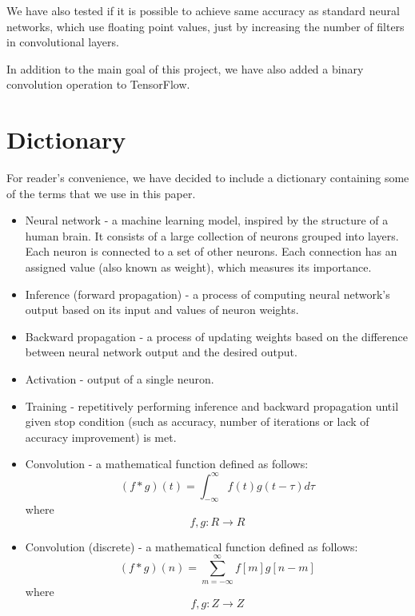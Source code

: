 \documentclass[licencjacka]{pracamgr}
\begin{document}
	We have also tested if it is possible to achieve same accuracy as standard neural networks, which use floating point values, just by increasing the number of filters in convolutional layers.
	
	In addition to the main goal of this project, we have also added a binary convolution operation to TensorFlow.

\chapter{Dictionary}
    For reader's convenience, we have decided to include a dictionary containing some of the terms that we use in this paper. 
    
    \begin{itemize}
        \item Neural network - a machine learning model, inspired by the structure of a human brain. It consists of a large collection of neurons grouped into layers. Each neuron is connected to a set of other neurons. Each connection has an assigned value (also known as weight), which measures its importance.
        
        \item Inference (forward propagation) - a process of computing neural network's output based on its input and values of neuron weights.
        
        \item Backward propagation - a process of updating weights based on the difference between neural network output and the desired output.
        
         \item Activation - output of a single neuron.
        
        \item Training - repetitively performing inference and backward propagation until given stop condition (such as accuracy, number of iterations or lack of accuracy improvement) is met.
               
        \item Convolution - a mathematical function defined as follows: 
        $$ (f* g)(t) = \int_{-\infty}^{\infty} f(t)g(t-\tau)d\tau$$ where $$f,g: R\rightarrow R$$
        
        \item Convolution (discrete) - a mathematical function defined as follows: 
        $$ (f* g)(n) = \sum_{m=-\infty}^{\infty} f[m] g[n-m]$$ where $$f,g: Z\rightarrow Z$$
        

\end{itemize}
\end{document}
